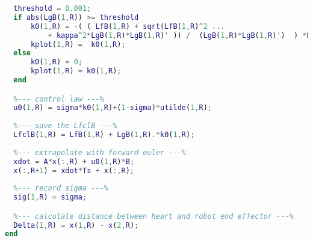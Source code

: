 \begin{lstlisting}[language=matlab]
  %--- Find safe controller ---%
  threshold = 0.001;
  if abs(LgB(1,R)) >= threshold
      k0(1,R) = -( ( LfB(1,R) + sqrt(LfB(1,R)^2 ...
          + kappa^2*LgB(1,R)*LgB(1,R)' )) /  (LgB(1,R)*LgB(1,R)')  ) *LgB(1,R);
      kplot(1,R) =  k0(1,R);
  else
      k0(1,R) = 0;
      kplot(1,R) = k0(1,R);
  end 

  %--- control law ---%
  u0(1,R) = sigma*k0(1,R)+(1-sigma)*utilde(1,R);
  
  %--- save the LfclB ---%  
  LfclB(1,R) = LfB(1,R) + LgB(1,R).*k0(1,R);
  
  %--- extrapolate with forward euler ---%
  xdot = A*x(:,R) + u0(1,R)*B;
  x(:,R+1) = xdot*Ts + x(:,R);
  
  %--- record sigma ---%
  sig(1,R) = sigma;

  %--- calculate distance between heart and robot end effector ---%
  Delta(1,R) = x(1,R) - x(2,R);
end
\end{lstlisting}